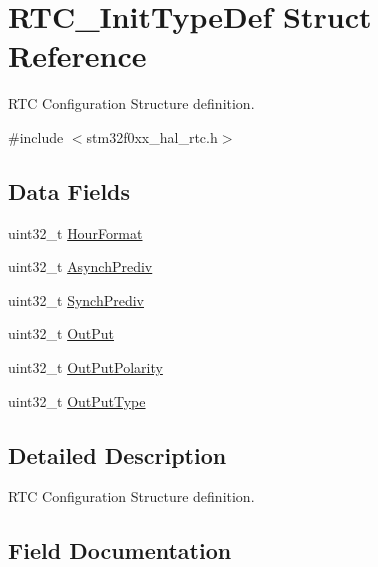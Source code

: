 \hypertarget{struct_r_t_c___init_type_def}{}\section{R\+T\+C\+\_\+\+Init\+Type\+Def Struct Reference}
\label{struct_r_t_c___init_type_def}


R\+TC Configuration Structure definition.  




{\ttfamily \#include $<$stm32f0xx\+\_\+hal\+\_\+rtc.\+h$>$}

\subsection*{Data Fields}
\begin{DoxyCompactItemize}
\item 
uint32\+\_\+t \hyperlink{struct_r_t_c___init_type_def_a6443afafaf63b709dad618a85502ef08}{Hour\+Format}
\item 
uint32\+\_\+t \hyperlink{struct_r_t_c___init_type_def_a765786c156872cccaeb4c34f6200a83b}{Asynch\+Prediv}
\item 
uint32\+\_\+t \hyperlink{struct_r_t_c___init_type_def_ae501e595c4cae92e73132b065baf726c}{Synch\+Prediv}
\item 
uint32\+\_\+t \hyperlink{struct_r_t_c___init_type_def_a1ac04944c56d427908f5dec0bd80155f}{Out\+Put}
\item 
uint32\+\_\+t \hyperlink{struct_r_t_c___init_type_def_a1db55b29ddfca7107f6ef6389e13d423}{Out\+Put\+Polarity}
\item 
uint32\+\_\+t \hyperlink{struct_r_t_c___init_type_def_ad01c869fb5e798c037f1d0b04a52d80d}{Out\+Put\+Type}
\end{DoxyCompactItemize}


\subsection{Detailed Description}
R\+TC Configuration Structure definition. 

\subsection{Field Documentation}
\mbox{\label{struct_r_t_c___init_type_def_a765786c156872cccaeb4c34f6200a83b}} 
